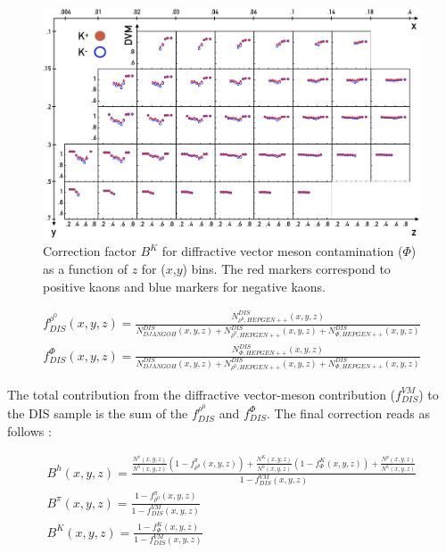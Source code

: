 \begin{figure}
  \centering
	\includegraphics[scale=0.7]{./gfx/DVMK.png}
	\caption{Correction factor $B^{K}$ for diffractive vector meson contamination ($\Phi$) as a function of $z$ for ($x$,$y$) bins. The red markers correspond to positive kaons and blue markers for negative kaons.}
	\label{DVMK}
\end{figure}

\begin{equation}
  \begin{split}
    f^{\rho^0}_{DIS}(x,y,z) = \frac{N^{DIS}_{\rho^0,HEPGEN++}(x,y,z)}{N^{DIS}_{DJANGOH}(x,y,z)+N^{DIS}_{\rho^0,HEPGEN++}(x,y,z)+N^{DIS}_{\Phi,HEPGEN++}(x,y,z)} \\
    f^{\Phi}_{DIS}(x,y,z) = \frac{N^{DIS}_{\Phi,HEPGEN++}(x,y,z)}{N^{DIS}_{DJANGOH}(x,y,z)+N^{DIS}_{\rho^0,HEPGEN++}(x,y,z)+N^{DIS}_{\Phi,HEPGEN++}(x,y,z)}
  \end{split}
\end{equation}

The total contribution from the diffractive vector-meson contribution ($f^{VM}_{DIS}$) to the DIS sample is the sum of the $f^{\rho^0}_{DIS}$ and $f^{\Phi}_{DIS}$. The final correction reads as follows :

\begin{equation}
  \begin{split}
  B^h(x,y,z) = \frac{ \frac{N^{\pi}(x,y,z)}{N^h(x,y,z)}\left (1-f^{\pi}_{\rho^0}(x,y,z)\right )
                   + \frac{N^K(x,y,z)}{N^h(x,y,z)}\left (1-f^{K}_{\Phi}(x,y,z)\right ) + \frac{N^p(x,y,z)}{N^h(x,y,z)} }{1-f^{VM}_{DIS}(x,y,z)} \\
  B^{\pi}(x,y,z) = \frac{1-f^{\pi}_{\rho^0}(x,y,z)}{1-f^{VM}_{DIS}(x,y,z)} \\
  B^K(x,y,z) = \frac{1-f^{K}_{\Phi}(x,y,z)}{1-f^{VM}_{DIS}(x,y,z)}
  \end{split}
\end{equation}

